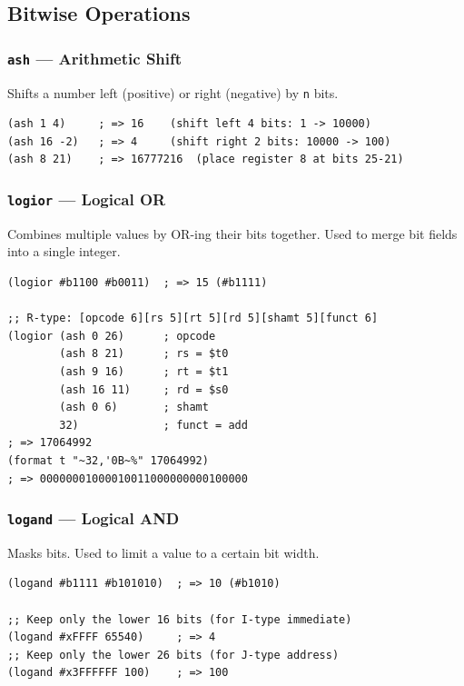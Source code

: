 \subsection{Bitwise Operations}

\subsubsection{\texttt{ash} --- Arithmetic Shift}

Shifts a number left (positive) or right (negative) by \texttt{n} bits.

\begin{lstlisting}
(ash 1 4)     ; => 16    (shift left 4 bits: 1 -> 10000)
(ash 16 -2)   ; => 4     (shift right 2 bits: 10000 -> 100)
(ash 8 21)    ; => 16777216  (place register 8 at bits 25-21)
\end{lstlisting}

\subsubsection{\texttt{logior} --- Logical OR}

Combines multiple values by OR-ing their bits together.
Used to merge bit fields into a single integer.

\begin{lstlisting}
(logior #b1100 #b0011)  ; => 15 (#b1111)

;; R-type: [opcode 6][rs 5][rt 5][rd 5][shamt 5][funct 6]
(logior (ash 0 26)      ; opcode
        (ash 8 21)      ; rs = $t0
        (ash 9 16)      ; rt = $t1
        (ash 16 11)     ; rd = $s0
        (ash 0 6)       ; shamt
        32)             ; funct = add
; => 17064992
(format t "~32,'0B~%" 17064992)
; => 00000001000010011000000000100000
\end{lstlisting}

\subsubsection{\texttt{logand} --- Logical AND}

Masks bits. Used to limit a value to a certain bit width.

\begin{lstlisting}
(logand #b1111 #b101010)  ; => 10 (#b1010)

;; Keep only the lower 16 bits (for I-type immediate)
(logand #xFFFF 65540)     ; => 4
;; Keep only the lower 26 bits (for J-type address)
(logand #x3FFFFFF 100)    ; => 100
\end{lstlisting}

